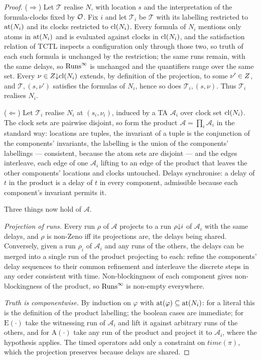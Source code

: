 \begin{proof}
($\Rightarrow$) Let $\mathcal T$ realise $N$, with location $s$ and the
interpretation of the formula-clocks fixed by $\mathcal{O}$. Fix $i$ and let
$\mathcal T_i$ be $\mathcal T$ with its labelling restricted to $\mathrm{at}(N_i)$
and its clocks restricted to $\mathrm{cl}(N_i)$. Every formula of $N_i$ mentions
only atoms in $\mathrm{at}(N_i)$ and is evaluated against clocks in
$\mathrm{cl}(N_i)$, and the satisfaction relation of TCTL inspects a configuration
only through those two, so truth of each such formula is unchanged by the
restriction; the same runs remain, with the same delays, so
$\mathrm{Runs}^{\infty}$ is unchanged and the quantifiers range over the same set. Every
$\nu\in Z{\downarrow}\mathrm{cl}(N_i)$ extends, by definition of the projection, to
some $\nu'\in Z$, and $\mathcal T,(s,\nu')$ satisfies the formulas of $N_i$, hence so does
$\mathcal T_i,(s,\nu)$. Thus $\mathcal T_i$ realises $N_i$.

($\Leftarrow$) Let $\mathcal T_i$ realise $N_i$ at $(s_i,\nu_i)$, induced by a
TA $\mathcal A_i$ over clock set $\mathrm{cl}(N_i)$. The clock sets are pairwise
disjoint, so form the product $\mathcal A=\prod_i\mathcal A_i$ in the standard
way: locations are tuples, the invariant of a tuple is the conjunction of the
components' invariants, the labelling is the union of the components'
labellings --- consistent, because the atom sets are disjoint --- and the edges
interleave, each edge of one $\mathcal A_i$ lifting to an edge of the product
that leaves the other components' locations and clocks untouched. Delays
synchronise: a delay of $t$ in the product is a delay of $t$ in every component,
admissible because each component's invariant permits it.

Three things now hold of $\mathcal A$.

\emph{Projection of runs.} Every run $\rho$ of $\mathcal A$ projects to a run
$\rho{\downarrow}i$ of $\mathcal A_i$ with the same delays, and $\rho$ is
non-Zeno iff its projections are, the delays being shared. Conversely, given a
run $\rho_i$ of $\mathcal A_i$ and any runs of the others, the delays can be
merged into a single run of the product projecting to each: refine the
components' delay sequences to their common refinement and interleave the
discrete steps in any order consistent with time. Non-blockingness of each
component gives non-blockingness of the product, so $\mathrm{Runs}^{\infty}$ is non-empty
everywhere.

\emph{Truth is componentwise.} By induction on $\varphi$ with
$\mathrm{at}(\varphi)\subseteq\mathrm{at}(N_i)$: for a literal this is the definition of
the product labelling; the boolean cases are immediate; for
$\mathrm{E}(\cdot)$ take the witnessing run of $\mathcal A_i$ and lift it
against arbitrary runs of the others, and for $\mathrm{A}(\cdot)$ take any run
of the product and project it to $\mathcal A_i$, where the hypothesis applies.
The timed operators add only a constraint on $\mathit{time}(\pi)$, which the
projection preserves because delays are shared.


\end{proof}
